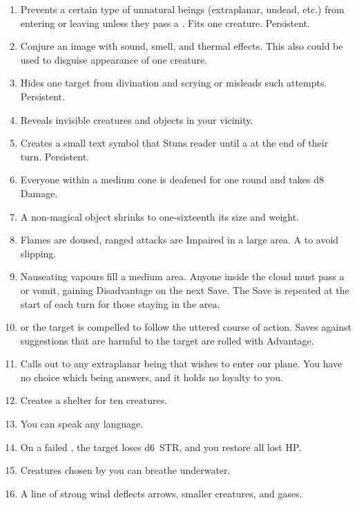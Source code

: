 \documentclass[itdr]{subfiles}
\begin{document}
\begin{enumerate}
	\vfill
	\break

	\item {} Prevents a certain type of unnatural beings (extraplanar, undead, etc.) from entering or leaving unless they pass a . Fits one creature. Persistent.
	\item {} Conjure an image with sound, smell, and thermal effects. This also could be used to disguise appearance of one creature.
	\item {} Hides one target from \mbox{divination} and scrying or misleads such attempts. \mbox{Persistent.}
	\item {} Reveals invisible creatures and objects in your vicinity.
	\item {} Creates a small text symbol that Stuns reader until a  at the end of their turn. Persistent.
	\item {} Everyone within a medium cone is deafened for one round and takes d8 Damage.
	\item {} A non-magical object shrinks to one-sixteenth its size and weight.
	\item {} Flames are doused, ranged attacks are Impaired in a large area. A  to avoid slipping.
	\item {} Nauseating vapours fill a medium area. Anyone inside the cloud must pass a  or vomit, gaining Disadvantage on the next Save. The Save is repeated at the start of each turn for those staying in the area.
	\item {}  or the target is \mbox{compelled} to follow the uttered course of action. Saves against suggestions that are harmful to the target are rolled with Advantage.
	\item {} Calls out to any extraplanar being that wishes to enter our plane. You have no choice which being answers, and it holds no loyalty to you.
	\item {} Creates a shelter for ten creatures.
	\item {} You can speak any language.
	\item {} On a failed , the target loses d6~STR, and you restore all lost HP.
	\item {} Creatures chosen by you can breathe underwater.
	\item {} A line of strong wind deflects arrows, smaller creatures, and gases.
\end{enumerate}
\end{document}
